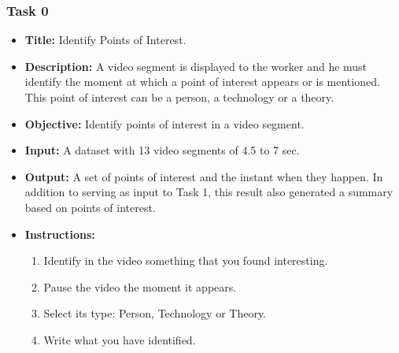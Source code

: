 \subsubsection{Task 0}


\begin{itemize}
\item \textbf{Title:} Identify Points of Interest.

\item \textbf{Description:} A video segment is displayed to the worker and he must identify the moment at which a point of interest appears or is mentioned. This point of interest can be a person, a technology or a theory.

\item \textbf{Objective:} Identify points of interest in a video segment.


\item \textbf{Input:} A dataset with 13 video segments of 4.5 to 7 sec.


\item \textbf{Output:} A set of points of interest and the instant when they happen. In addition to serving as input to Task 1, this result also generated a summary based on points of interest.


\item \textbf{Instructions:} \begin{enumerate}
	\item Identify in the video something that you found interesting.
	\item Pause the video the moment it appears.
	\item Select its type: Person, Technology or Theory.
	\item Write what you have identified. 
\end{enumerate}


\end{itemize}
